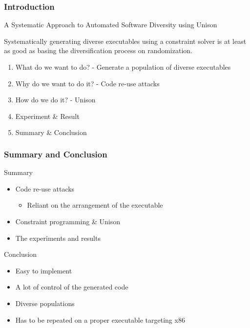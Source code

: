 \documentclass{beamer}
\begin{document}
\begin{frame}
	\frametitle{Introduction}

	A Systematic Approach to Automated Software Diversity using Unison

	\vspace{0.5cm}

	Systematically generating diverse executables using a constraint solver is at least as good as basing the diversification process on randomization.

	\begin{enumerate}
		\item What do we want to do? - Generate a population of diverse executables
		\item Why do we want to do it? - Code re-use attacks
		\item How do we do it? - Unison
		\item Experiment \& Result
		\item Summary \& Conclusion
	\end{enumerate}

\end{frame}











\begin{frame}
	\frametitle{Summary and Conclusion}

	Summary
	\begin{itemize}
		\item Code re-use attacks
			\begin{itemize}
				\item Reliant on the arrangement of the executable
			\end{itemize}
		\item Constraint programming \& Unison
		\item The experiments and results
	\end{itemize}

	\vspace{0.5cm}
	
	Conclusion
	\begin{itemize}
		\item Easy to implement
		\item A lot of control of the generated code
		\item Diverse populations
		\item Has to be repeated on a proper executable targeting x86
	\end{itemize}

\end{frame}

\begin{frame}
	\printbibliography[heading=bibintoc]
\end{frame}


\end{document}
